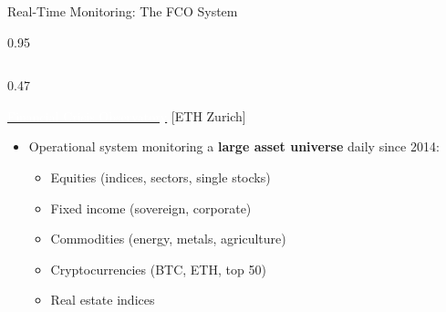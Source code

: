 \documentclass[9pt, aspectratio=169, t]{beamer}
\begin{document}
\begin{frame}{Real-Time Monitoring: The FCO System}
    \begin{cminipage}{0.95\textwidth}
    {\footnotesize
    \begin{columns}[T]
        \begin{column}{0.47\textwidth}
            \begin{block}{\href{https://www.er.ethz.ch/financial-crisis-observatory.html}{\textcolor{white}{Financial Crisis Observatory}} {\scriptsize[ETH Zurich]}}
                \begin{itemize}\setlength{\itemsep}{1pt}
                    \item Operational system monitoring a \textbf{large asset universe} daily since 2014:
                    \begin{itemize}\setlength{\itemsep}{0pt}
                        \item Equities (indices, sectors, single stocks)
                        \item Fixed income (sovereign, corporate)
                        \item Commodities (energy, metals, agriculture)
                        \item Cryptocurrencies (BTC, ETH, top 50)
                        \item Real estate indices
                    \end{itemize}
                \end{itemize}
            \end{block}


\end{column}
\end{columns}}
\end{cminipage}
\end{frame}
\end{document}
